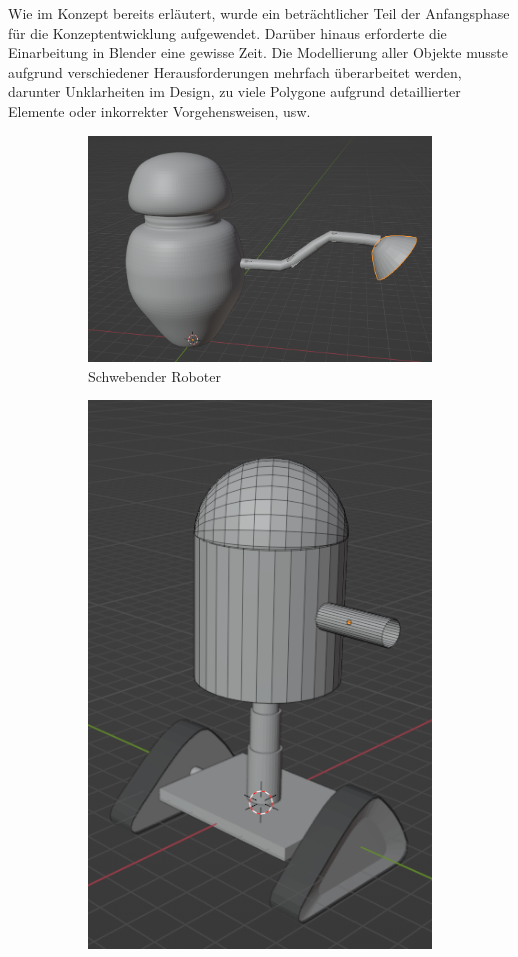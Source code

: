 Wie im Konzept bereits erläutert, wurde ein beträchtlicher Teil der Anfangsphase für die Konzeptentwicklung aufgewendet. Darüber hinaus erforderte die Einarbeitung in Blender eine gewisse Zeit. Die Modellierung aller Objekte musste aufgrund verschiedener Herausforderungen mehrfach überarbeitet werden, darunter Unklarheiten im Design, zu viele Polygone aufgrund detaillierter Elemente oder inkorrekter Vorgehensweisen, usw.
\begin{figure}[H]
	\begin{subfigure}{0.5\textwidth}
		\centering
		\includegraphics[height=0.3\pageheight,keepaspectratio]{pics/6}
		\caption{Schwebender Roboter}
	\end{subfigure}
	\begin{subfigure}{0.5\textwidth}
		\centering
		\includegraphics[height=0.3\pageheight,keepaspectratio]{pics/7}

\end{subfigure}
\end{figure}
